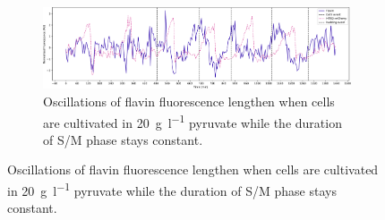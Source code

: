 \begin{figure}
  \centering
  \begin{subfigure}[htpb]{0.9\textwidth}
   \centering
   \includegraphics[width=\textwidth]{pyruvate_single_birth_plot_edit.pdf}
   \caption{
     Oscillations of flavin fluorescence lengthen when cells are cultivated in \SI{20}{\gram~\litre^{-1}} pyruvate while the duration of S/M phase stays constant.
   }
   \label{fig:biology-pyruvate-single}


\end{subfigure}
\end{figure}
